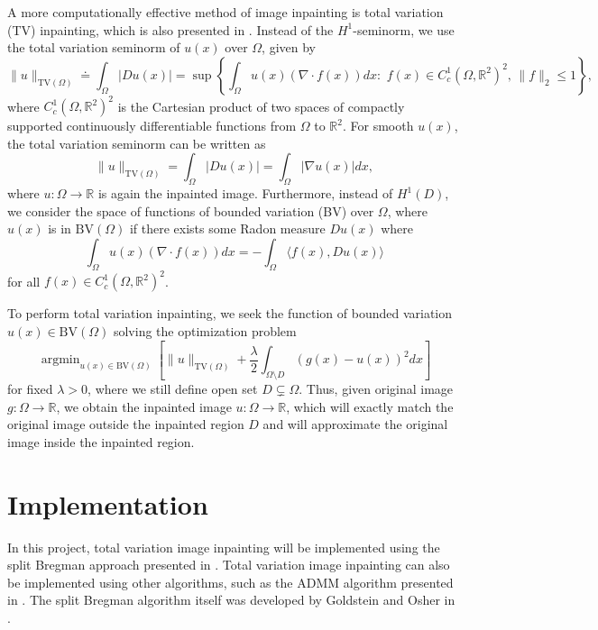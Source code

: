 \documentclass[11pt,reqno,twoside]{amsart}
\theoremstyle{plain}
\theoremstyle{definition}
\newcommand{\argmin}{\operatorname{argmin}}
\numberwithin{figure}{section}
\numberwithin{equation}{section}
\begin{document}
A more computationally effective method of image inpainting is total variation (TV) inpainting, which is also presented in \cite{ge2012}.  Instead of the $H^1$-seminorm, we use the total variation seminorm of $u(x)$ over $\Omega$, given by
\begin{equation*}
\|u\|_{\text{TV}(\Omega)} \doteq \int_\Omega |Du(x)| = \operatorname{sup}\left\{\int_\Omega u(x) (\nabla \cdot f(x))dx: \,\, f(x) \in C_c^1(\Omega, \mathbb{R}^2)^2, \, \|f\|_2 \leqslant 1 \right\},
\end{equation*}
where $C_c^1(\Omega, \mathbb{R}^2)^2$ is the Cartesian product of two spaces of compactly supported continuously differentiable functions from $\Omega$ to $\mathbb{R}^2$.  For smooth $u(x)$, the total variation seminorm can be written as 
\begin{equation*}
\|u\|_{\text{TV}(\Omega)} = \int_\Omega |Du(x)| = \int_\Omega |\nabla u(x)|dx,
\end{equation*}
where $u: \Omega \to \mathbb{R}$ is again the inpainted image.  Furthermore, instead of $H^1(D)$, we consider the space of functions of bounded variation (BV) over $\Omega$, where $u(x)$ is in $\text{BV}(\Omega)$ if there exists some Radon measure $Du(x)$ where
\begin{equation*}
\int_\Omega u(x) (\nabla \cdot f(x)) dx = -\int_\Omega \langle f(x), Du(x) \rangle
\end{equation*}
for all $f(x) \in C_c^1(\Omega, \mathbb{R}^2)^2$.  

To perform total variation inpainting, we seek the function of bounded variation $u(x) \in \text{BV}(\Omega)$ solving the optimization problem
\begin{equation*}
\argmin_{u(x) \in \text{BV}(\Omega)} \left[  \|u\|_{\text{TV}(\Omega)} + \frac{\lambda}{2} \int_{\Omega \setminus D} (g(x) - u(x))^2 dx\right]
\end{equation*}
for fixed $\lambda > 0$, where we still define open set $D \subsetneq \Omega$.  Thus, given original image $g: \Omega \to \mathbb{R}$, we obtain the inpainted image $u: \Omega \to \mathbb{R}$, which will exactly match the original image outside the inpainted region $D$ and will approximate the original image inside the inpainted region.

\newpage 

\section{Implementation}

In this project, total variation image inpainting will be implemented using the split Bregman approach presented in \cite{ge2012}.  Total variation image inpainting can also be implemented using other algorithms, such as the ADMM algorithm presented in \cite{qgm2014}.  The split Bregman algorithm itself was developed by Goldstein and Osher in \cite{go2009}.
\end{document}
